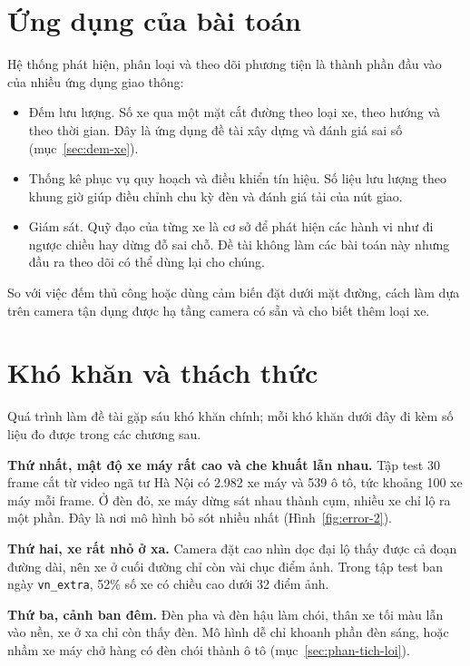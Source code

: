 \section{Ứng dụng của bài toán}

Hệ thống phát hiện, phân loại và theo dõi phương tiện là thành phần đầu vào của nhiều ứng dụng giao thông:
\begin{itemize}
  \item Đếm lưu lượng. Số xe qua một mặt cắt đường theo loại xe, theo hướng và theo thời gian. Đây là ứng dụng
        đề tài xây dựng và đánh giá sai số (mục~\ref{sec:dem-xe}).
  \item Thống kê phục vụ quy hoạch và điều khiển tín hiệu. Số liệu lưu lượng theo khung giờ giúp điều chỉnh
        chu kỳ đèn và đánh giá tải của nút giao.
  \item Giám sát. Quỹ đạo của từng xe là cơ sở để phát hiện các hành vi như đi ngược chiều hay dừng đỗ sai
        chỗ. Đề tài không làm các bài toán này nhưng đầu ra theo dõi có thể dùng lại cho chúng.
\end{itemize}

So với việc đếm thủ công hoặc dùng cảm biến đặt dưới mặt đường, cách làm dựa trên camera tận dụng được hạ tầng camera
có sẵn và cho biết thêm loại xe.

\section{Khó khăn và thách thức}
\label{sec:kho-khan}

Quá trình làm đề tài gặp sáu khó khăn chính; mỗi khó khăn dưới đây đi kèm số liệu đo được trong các chương sau.

\textbf{Thứ nhất, mật độ xe máy rất cao và che khuất lẫn nhau.} Tập test 30 frame cắt từ video ngã tư Hà Nội có 2.982
xe máy và 539 ô tô, tức khoảng 100 xe máy mỗi frame. Ở đèn đỏ, xe máy dừng sát nhau thành cụm, nhiều xe chỉ lộ ra một
phần. Đây là nơi mô hình bỏ sót nhiều nhất (Hình~\ref{fig:error-2}).

\textbf{Thứ hai, xe rất nhỏ ở xa.} Camera đặt cao nhìn dọc đại lộ thấy được cả đoạn đường dài, nên xe ở cuối đường chỉ
còn vài chục điểm ảnh. Trong tập test ban ngày \texttt{vn\_extra}, 52\% số xe có chiều cao dưới 32 điểm ảnh.

\textbf{Thứ ba, cảnh ban đêm.} Đèn pha và đèn hậu làm chói, thân xe tối màu lẫn vào nền, xe ở xa chỉ còn thấy đèn.
Mô hình dễ chỉ khoanh phần đèn sáng, hoặc nhầm xe máy chở hàng có đèn chói thành ô tô (mục~\ref{sec:phan-tich-loi}).

